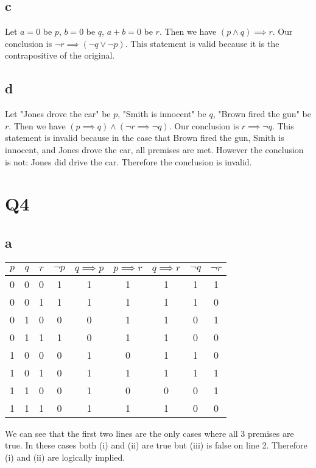\documentclass[12pt]{article}
\begin{document}
\subsection{c}
Let $a = 0$ be $p$, $b = 0$ be $q$, $a+b =0$ be $r$.
\newline
Then we have $(p \land q) \implies r$. Our conclusion is $\neg r \implies (\neg q \lor \neg p)$.
\newline
This statement is valid because it is the contrapositive of the original.

\subsection{d}
Let "Jones drove the car" be $p$, "Smith is innocent" be $q$,
"Brown fired the gun" be $r$.
\newline
Then we have $(p \implies q) \land (\neg r \implies \neg q)$. Our conclusion is $r \implies \neg q$.
\newline
This statement is invalid because in the case that Brown fired the gun, Smith is innocent, and Jones drove the car,
all premises are met. However the conclusion is not: Jones did drive the car. Therefore the conclusion
is invalid.


\section{Q4}
\subsection{a}
\begin{tabular}{ | c | c | c | c | c | c | c | c | c |}
    \hline
    $p$ & $q$ & $r$ & $\neg p$ & $q \implies p$ & $p \implies r$ & $q \implies r $ & $\neg q$ & $\neg r$\\
    \hline
    0 & 0 & 0 & 1 & 1 & 1 & 1 & 1 & 1\\
    \hline
    0 & 0 & 1 & 1 & 1 & 1 & 1 & 1 & 0\\
    \hline
    0 & 1 & 0 & 0 & 0 & 1 & 1 & 0 & 1\\
    \hline
    0 & 1 & 1 & 1 & 0 & 1 & 1 & 0 & 0\\
    \hline
    1 & 0 & 0 & 0 & 1 & 0 & 1 & 1 & 0\\
    \hline
    1 & 0 & 1 & 0 & 1 & 1 & 1 & 1 & 1\\
    \hline
    1 & 1 & 0 & 0 & 1 & 0 & 0 & 0 & 1\\
    \hline
    1 & 1 & 1 & 0 & 1 & 1 & 1 & 0 & 0\\
    \hline
\end{tabular}
\newline
We can see that the first two lines are the only cases where all 3 premises are true.
In these cases both (i) and (ii) are true but (iii) is false on line 2. Therefore (i)
and (ii) are logically implied.
\end{document}
